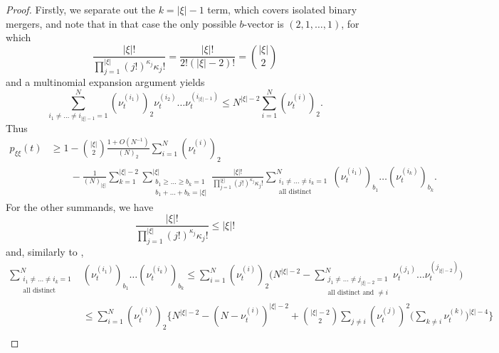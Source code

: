 \documentclass{article}
\theoremstyle{definition}
\newcommand{\1}[1]{\mathbbm{1}_{\{#1\}}}
\begin{document}
\begin{proof}
Firstly, we separate out the $k = | \xi | - 1$ term, which covers isolated binary mergers, and note that in that case the only possible $b$-vector is $(2, 1, \ldots, 1)$, for which
\begin{equation*}
\frac{ | \xi |! }{ \prod_{ j = 1 }^{ | \xi | } ( j ! )^{ \kappa_j } \kappa_j ! } = \frac{ | \xi |! }{ 2 ! ( | \xi | - 2 ) ! } = \binom{ | \xi | }{ 2 }
\end{equation*}
and a multinomial expansion argument yields
\begin{equation*}
\sum_{ i_1 \neq \ldots \neq i_{ | \xi | - 1 } = 1 }^N ( \nu_t^{ ( i_1 ) } )_2 \nu_t^{ ( i_2 ) } \ldots \nu_t^{ ( i_{ | \xi | - 1 } ) }
\leq N^{ | \xi | - 2 } \sum_{ i = 1 }^N ( \nu_t^{ ( i ) } )_2 .
\end{equation*}
Thus
\begin{align*}
p_{ \xi \xi }( t ) &\geq 1 - \binom{ | \xi | }{ 2 } \frac{ 1 + O( N^{ -1 } ) }{ ( N )_2 } \sum_{ i = 1 }^N ( \nu_t^{ ( i ) } )_2 \\
&\qquad - \frac{ 1 }{ ( N )_{ | \xi | } } \sum_{ k = 1 }^{ | \xi | - 2 } \sum_{ \substack{ b_1 \geq \ldots \geq b_k = 1 \\ b_1 + \ldots + b_k = | \xi | } }^{ | \xi | } \frac{ | \xi |! }{ \prod_{ j = 1 }^{ | \xi | } ( j ! )^{ \kappa_j } \kappa_j ! } \sum_{ \substack{ i_1 \neq \ldots \neq i_k = 1 \\ \text{all distinct} } }^N( \nu_t^{ ( i_1 ) } )_{ b_1 } \ldots ( \nu_t^{ ( i_k ) } )_{ b_k }.
\end{align*}
For the other summands, we have
\begin{equation*}
\frac{ | \xi |! }{ \prod_{ j = 1 }^{ | \xi | } ( j ! )^{ \kappa_j } \kappa_j ! } \leq | \xi | !
\end{equation*}
and, similarly to \citet[Lemma 1, Case 3]{koskela2018},
\begin{align*}
\sum_{ \substack{ i_1 \neq \ldots \neq i_k = 1 \\ \text{all distinct} } }^N &( \nu_t^{ ( i_1 ) } )_{ b_1 } \ldots ( \nu_t^{ ( i_k ) } )_{ b_k } \leq \sum_{ i = 1 }^N ( \nu_t^{ ( i ) } )_2 \Bigg( N^{ | \xi | - 2 } - \sum_{ \substack{ j_1 \neq \ldots \neq j_{ | \xi | - 2 } = 1 \\ \text{all distinct and } \neq i } }^N \nu_t^{ ( j_1 ) } \ldots \nu_t^{ ( j_{ | \xi | - 2 } ) } \Bigg) \\
&\leq \sum_{ i = 1 }^N ( \nu_t^{ ( i ) } )_2 \Bigg\{ N^{ | \xi | - 2 } - ( N - \nu_t^{ ( i ) } )^{ | \xi | - 2 } + \binom{ | \xi | - 2 }{ 2 } \sum_{ j \neq i } ( \nu_t^{ ( j ) } )^2 \Bigg( \sum_{ k \neq i } \nu_t^{ ( k ) } \Bigg)^{ | \xi | - 4 } \Bigg\} \\

\end{align*}
\end{proof}
\end{document}
